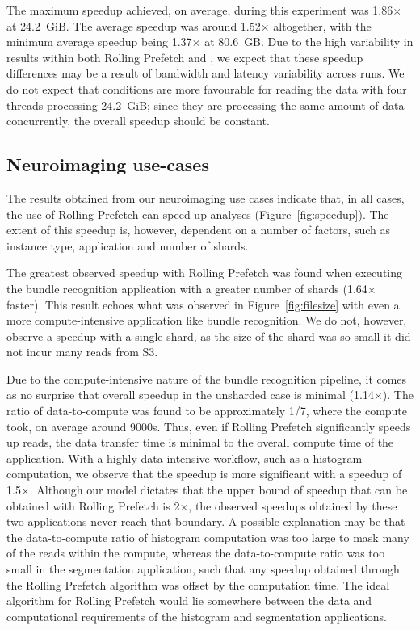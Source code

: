 The maximum speedup achieved, on average, during this experiment was
1.86$\times$ at 24.2~GiB. The average speedup was around 1.52$\times$
altogether, with the minimum average speedup being 1.37$\times$ at 80.6~GB. Due
to the high variability in results within both Rolling Prefetch and \sfs, we
expect that these speedup differences may be a result of bandwidth and latency
variability across runs. We do not expect that conditions are more favourable
for reading the data with four threads processing 24.2~GiB; since they are
processing the same amount of data concurrently, the overall speedup should be
constant.

\subsection{Neuroimaging use-cases}

The results obtained from our neuroimaging use cases indicate that, in all
cases, the use of Rolling Prefetch can speed up analyses
(Figure~\ref{fig:speedup}). The extent of this speedup is, however, dependent on
a number of factors, such as instance type, application and number of shards.

The greatest observed speedup with Rolling Prefetch was found when executing the
bundle recognition application with a greater number of shards (1.64$\times$
faster). This result echoes what was observed in Figure~\ref{fig:filesize} with
even a more compute-intensive application like bundle recognition. We do not,
however, observe a speedup with a single shard, as the size of the shard was so
small it did not incur many reads from S3.

Due to the compute-intensive nature of the bundle recognition pipeline, it comes
as no surprise that overall speedup in the unsharded case is minimal
(1.14$\times$). The ratio of data-to-compute was found to be approximately 1/7,
where the compute took, on average around 9000s. Thus, even if Rolling Prefetch
significantly speeds up reads, the data transfer time is minimal to the overall
compute time of the application. With a highly data-intensive workflow, such as
a histogram computation, we observe that the speedup is more significant with a
speedup of 1.5$\times$. Although our model dictates that the upper bound of
speedup that can be obtained with Rolling Prefetch is 2$\times$, the observed
speedups obtained by these two applications never reach that boundary. A
possible explanation may be that the data-to-compute ratio of histogram
computation was too large to mask many of the reads within the compute, whereas
the data-to-compute ratio was too small in the segmentation application, such
that any speedup obtained through the Rolling Prefetch algorithm was offset by
the computation time. The ideal algorithm for Rolling Prefetch would lie
somewhere between the data and computational requirements of the histogram and
segmentation applications.

